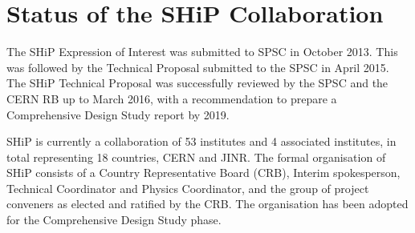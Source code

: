 \section{Status of the SHiP Collaboration}
\label{sec:collaboration}

The SHiP Expression of Interest was submitted to SPSC in October 2013. This was followed by the Technical Proposal submitted to the SPSC in April 2015. The SHiP Technical Proposal was successfully reviewed by the SPSC and the CERN RB up to March 2016, with a recommendation to prepare a Comprehensive Design Study report by 2019.

SHiP is currently a collaboration of 53 institutes and 4 associated institutes, in  total representing 18 countries, CERN and JINR. The formal organisation of SHiP consists of a Country Representative Board (CRB), Interim spokesperson, Technical Coordinator and Physics Coordinator, and the group of project conveners as elected and ratified by the CRB. The organisation has been adopted for the Comprehensive Design Study phase.  
